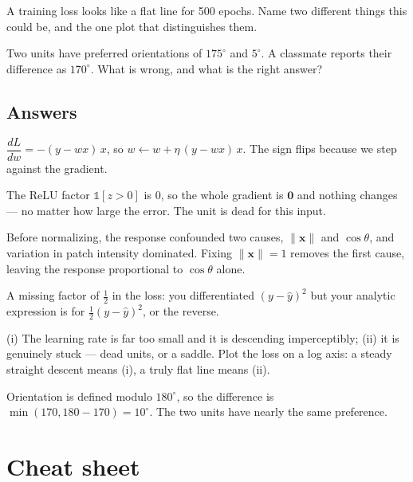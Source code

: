 \documentclass[11pt]{article}
\begin{document}
 A training loss looks like a flat line for 500 epochs. Name two
different things this could be, and the one plot that distinguishes them.

 Two units have preferred orientations of $175^\circ$ and $5^\circ$. A
classmate reports their difference as $170^\circ$. What is wrong, and what is
the right answer?

\subsection*{Answers}

 $\dfrac{dL}{dw} = -(y - wx)\,x$, so
$w \leftarrow w + \eta\,(y - wx)\,x$. The sign flips because we step against the
gradient.

 The ReLU factor $\mathbb{1}[z>0]$ is $0$, so the whole gradient is
$\boldsymbol{0}$ and nothing changes --- no matter how large the error. The unit
is dead for this input.

 Before normalizing, the response confounded two causes,
$\|\boldsymbol{x}\|$ and $\cos\theta$, and variation in patch intensity
dominated. Fixing $\|\boldsymbol{x}\| = 1$ removes the first cause, leaving the
response proportional to $\cos\theta$ alone.

 A missing factor of $\tfrac{1}{2}$ in the loss: you differentiated
$(y-\hat{y})^2$ but your analytic expression is for
$\tfrac{1}{2}(y-\hat{y})^2$, or the reverse.

 (i) The learning rate is far too small and it is descending
imperceptibly; (ii) it is genuinely stuck --- dead units, or a saddle. Plot the
loss on a log axis: a steady straight descent means (i), a truly flat line means
(ii).

 Orientation is defined modulo $180^\circ$, so the difference is
$\min(170, 180-170) = 10^\circ$. The two units have nearly the same preference.

\section*{Cheat sheet}
\end{document}
